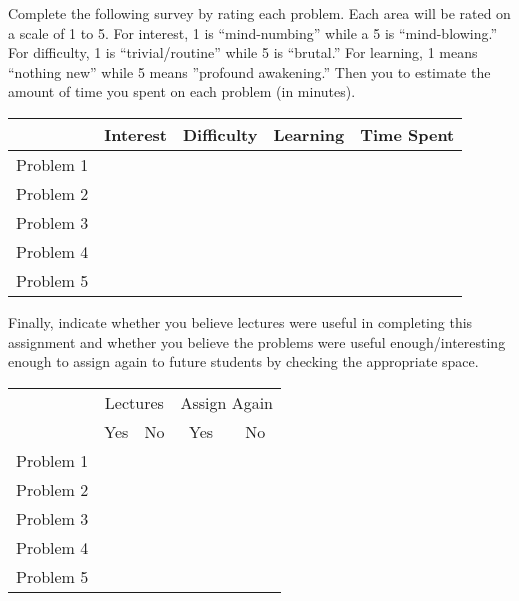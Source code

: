 \documentclass[11pt,letterpaper]{article}
\begin{document}
\newpage



 \pvspace{0.3cm}

Complete the following survey by rating each problem. Each area will be rated on a scale of 1 to 5. For interest, 1 is ``mind-numbing'' while a 5 is ``mind-blowing.'' For difficulty, 1 is ``trivial/routine'' while 5 is ``brutal.'' For learning, 1 means ``nothing new'' while 5 means ''profound awakening.'' Then you to estimate the amount of time you spent on each problem (in minutes). 

\vspace{0.25cm}
\begin{center}
\begin{tabular}{c||c|c|c|c|}
 & Interest & Difficulty & Learning & Time Spent \\ \hline \hline
Problem 1 &  &  &  &  \\ \hline
Problem 2 &  &  &  &  \\ \hline
Problem 3 &  &  &  &  \\ \hline
Problem 4 &  &  &  &  \\ \hline
Problem 5 &  &  &  &  \\ \hline
\end{tabular}
\end{center}
\vspace{0.25cm}

Finally, indicate whether you believe lectures were useful in completing this assignment and whether you believe the problems were useful enough/interesting enough to assign again to future students by checking the appropriate space.

\vspace{0.25cm}
\begin{center}
\begin{tabular}{c||c|c|c|c|}
  & \multicolumn{2}{c|}{Lectures} &  \multicolumn{2}{c|}{Assign Again} \\ \cline{2-5}
   & Yes & No & Yes & No \\ \hline \hline
  Problem 1 &  &  &  &  \\ \hline 
  Problem 2 &  &  &  &  \\ \hline 
  Problem 3 &  &  &  &  \\ \hline 
  Problem 4 &  &  &  &  \\ \hline 
  Problem 5 &  &  &  &  \\ \hline 
\end{tabular}
\end{center}
\end{document}
